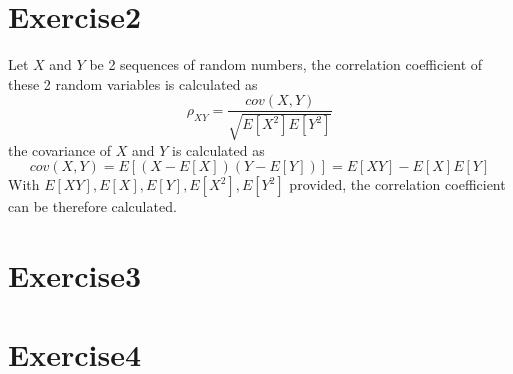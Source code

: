 \documentclass[paper=a4, fontsize=11pt]{scrartcl} %
\numberwithin{equation}{section} %
\numberwithin{figure}{section} %
\numberwithin{table}{section} %
\begin{document}
\section{Exercise2}
  Let $X$ and $Y$ be 2 sequences of random numbers, the correlation coefficient of these 2 random variables is calculated as
  \begin{equation}
  	\rho_{XY} = \frac{cov(X, Y)}{\sqrt{E[X^2] E[Y^2]}}
  \end{equation}
  the covariance of $X$ and $Y$ is calculated as
  \begin{equation}
  	cov(X, Y) = E[(X-E[X])(Y-E[Y])] = E[XY] - E[X]E[Y]
  \end{equation}
  With $E[XY], E[X], E[Y], E[X^2], E[Y^2]$ provided, the correlation coefficient can be therefore calculated.
\section{Exercise3}

\section{Exercise4}
\end{document}

